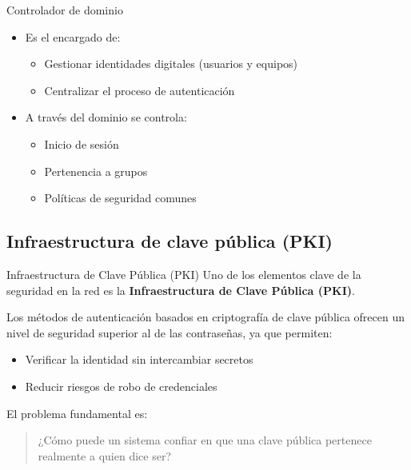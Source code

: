 \documentclass{beamer}
\begin{document}
\begin{frame}{Controlador de dominio}
\begin{itemize}
  \item Es el encargado de:
  \begin{itemize}
    \item Gestionar identidades digitales (usuarios y equipos)
    \item Centralizar el proceso de autenticación
  \end{itemize}
  \item A través del dominio se controla:
  \begin{itemize}
    \item Inicio de sesión
    \item Pertenencia a grupos
    \item Políticas de seguridad comunes
  \end{itemize}
\end{itemize}
\end{frame}


\subsection{Infraestructura de clave pública (PKI)}

\begin{frame}{Infraestructura de Clave Pública (PKI)}
Uno de los elementos clave de la seguridad en la red es la \textbf{Infraestructura de Clave Pública (PKI)}.

\vspace{0.3cm}
Los métodos de autenticación basados en criptografía de clave pública ofrecen un nivel de seguridad superior al de las contraseñas, ya que permiten:
\begin{itemize}
    \item Verificar la identidad sin intercambiar secretos
    \item Reducir riesgos de robo de credenciales
\end{itemize}

\vspace{0.2cm}
El problema fundamental es:
\begin{quote}
¿Cómo puede un sistema confiar en que una clave pública pertenece realmente a quien dice ser?
\end{quote}
\end{frame}
\end{document}
